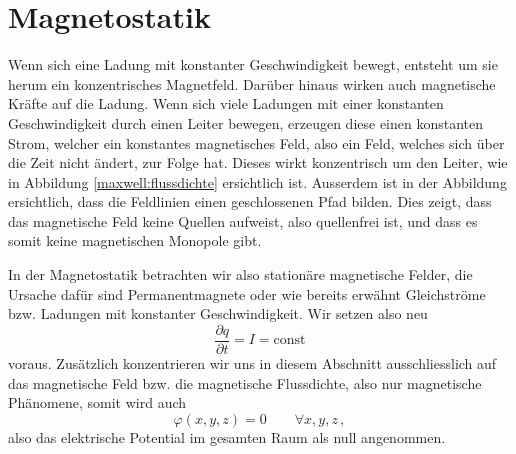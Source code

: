 %
%
%
%
\section{Magnetostatik\label{maxwell:magnetostatik}}


Wenn sich eine Ladung mit konstanter Geschwindigkeit bewegt, entsteht um sie herum ein konzentrisches Magnetfeld. Darüber hinaus wirken auch magnetische Kräfte auf die Ladung.
Wenn sich viele Ladungen mit einer konstanten Geschwindigkeit durch einen Leiter bewegen, erzeugen diese einen konstanten Strom, welcher ein konstantes magnetisches Feld, also ein Feld, welches sich über die Zeit nicht ändert, zur Folge hat. Dieses wirkt konzentrisch um den Leiter, wie in Abbildung \ref{maxwell:flussdichte} ersichtlich ist. Ausserdem ist in der Abbildung ersichtlich, dass die Feldlinien einen geschlossenen Pfad bilden. Dies zeigt, dass das magnetische Feld keine Quellen aufweist, also quellenfrei ist, und dass es somit keine magnetischen Monopole gibt.

In der Magnetostatik betrachten wir also stationäre magnetische Felder, die Ursache dafür sind Permanentmagnete oder wie bereits erwähnt Gleichströme bzw. Ladungen mit konstanter Geschwindigkeit.
Wir setzen also neu
\[ 
\frac{\partial q}{\partial t}
=
I
=
\text{const}
\]
voraus.
Zusätzlich konzentrieren wir uns in diesem Abschnitt ausschliesslich auf das magnetische Feld bzw. die magnetische Flussdichte, also nur magnetische Phänomene, somit wird auch
\[\varphi(x,y,z) = 0 \qquad \forall x,y,z\, ,\] 
also das elektrische Potential im gesamten Raum als null angenommen. 



